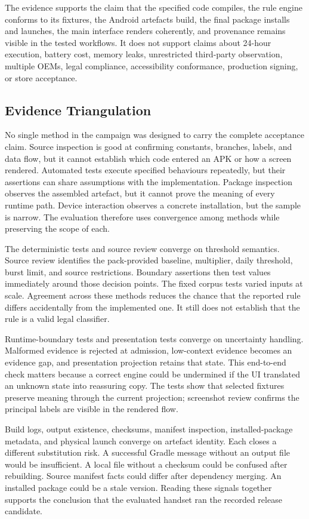 The evidence supports the claim that the specified code compiles, the rule engine conforms to its fixtures, the Android artefacts build, the final package installs and launches, the main interface renders coherently, and provenance remains visible in the tested workflows. It does not support claims about 24-hour execution, battery cost, memory leaks, unrestricted third-party observation, multiple OEMs, legal compliance, accessibility conformance, production signing, or store acceptance.

\subsection{Evidence Triangulation}

No single method in the campaign was designed to carry the complete acceptance claim. Source inspection is good at confirming constants, branches, labels, and data flow, but it cannot establish which code entered an APK or how a screen rendered. Automated tests execute specified behaviours repeatedly, but their assertions can share assumptions with the implementation. Package inspection observes the assembled artefact, but it cannot prove the meaning of every runtime path. Device interaction observes a concrete installation, but the sample is narrow. The evaluation therefore uses convergence among methods while preserving the scope of each.

The deterministic tests and source review converge on threshold semantics. Source review identifies the pack-provided baseline, multiplier, daily threshold, burst limit, and source restrictions. Boundary assertions then test values immediately around those decision points. The fixed corpus tests varied inputs at scale. Agreement across these methods reduces the chance that the reported rule differs accidentally from the implemented one. It still does not establish that the rule is a valid legal classifier.

Runtime-boundary tests and presentation tests converge on uncertainty handling. Malformed evidence is rejected at admission, low-context evidence becomes an evidence gap, and presentation projection retains that state. This end-to-end check matters because a correct engine could be undermined if the UI translated an unknown state into reassuring copy. The tests show that selected fixtures preserve meaning through the current projection; screenshot review confirms the principal labels are visible in the rendered flow.

Build logs, output existence, checksums, manifest inspection, installed-package metadata, and physical launch converge on artefact identity. Each closes a different substitution risk. A successful Gradle message without an output file would be insufficient. A local file without a checksum could be confused after rebuilding. Source manifest facts could differ after dependency merging. An installed package could be a stale version. Reading these signals together supports the conclusion that the evaluated handset ran the recorded release candidate.

